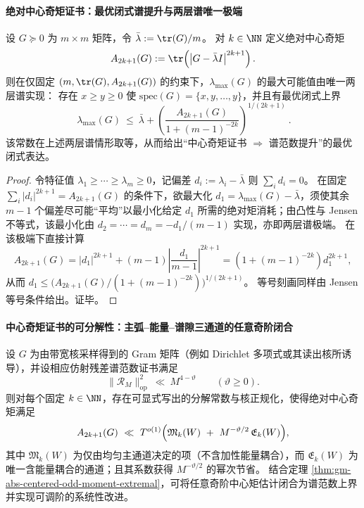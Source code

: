 \paragraph{绝对中心奇矩证书：最优闭式谱提升与两层谱唯一极端}
\begin{theorem}\label{thm:gm-abs-centered-odd-moment-extremal}
设 \(G\succeq 0\) 为 \(m\times m\) 矩阵，令 \(\bar\lambda:=\tr(G)/m\)。
对 \(k\in\NN\) 定义绝对中心奇矩
\[
A_{2k+1}(G):=\tr\!\left(\left|G-\bar\lambda I\right|^{2k+1}\right).
\]
则在仅固定 \((m,\tr(G),A_{2k+1}(G))\) 的约束下，\(\lambda_{\max}(G)\) 的最大可能值由唯一两层谱实现：
存在 \(x\ge y\ge 0\) 使 \(\mathrm{spec}(G)=\{x,y,\dots,y\}\)，并且有最优闭式上界
\[
\boxed{\ 
\lambda_{\max}(G)\ \le\ \bar\lambda+\left(\frac{A_{2k+1}(G)}{1+(m-1)^{-2k}}\right)^{\!1/(2k+1)}
\ }.
\]
该常数在上述两层谱情形取等，从而给出“中心奇矩证书 \(\Rightarrow\) 谱范数提升”的最优闭式表达。
\end{theorem}

\begin{proof}
令特征值 \(\lambda_1\ge\cdots\ge\lambda_m\ge 0\)，记偏差 \(d_i:=\lambda_i-\bar\lambda\) 则 \(\sum_i d_i=0\)。
在固定 \(\sum_i|d_i|^{2k+1}=A_{2k+1}(G)\) 的条件下，欲最大化 \(d_1=\lambda_{\max}(G)-\bar\lambda\)，须使其余 \(m-1\) 个偏差尽可能“平均”以最小化给定 \(d_1\) 所需的绝对矩消耗；由凸性与 Jensen 不等式，该最小化由
\(
d_2=\cdots=d_m=-d_1/(m-1)
\)
实现，亦即两层谱极端。
在该极端下直接计算
\[
A_{2k+1}(G)
=|d_1|^{2k+1}+(m-1)\left|\frac{d_1}{m-1}\right|^{2k+1}
=\left(1+(m-1)^{-2k}\right)d_1^{2k+1},
\]
从而 \(d_1\le \bigl(A_{2k+1}(G)/(1+(m-1)^{-2k})\bigr)^{1/(2k+1)}\)。
等号刻画同样由 Jensen 等号条件给出。证毕。
\end{proof}

\paragraph{中心奇矩证书的可分解性：主弧--能量--谱隙三通道的任意奇阶闭合}
\begin{proposition}\label{prop:gm-abs-centered-moment-three-channels}
设 \(G\) 为由带宽核采样得到的 Gram 矩阵（例如 Dirichlet 多项式或其读出核所诱导），并设相应仿射残差谱范数证书满足
\[
\|\mathcal{R}_M\|_{\mathrm{op}}^2\ \ll\ M^{4-\vartheta}\qquad(\vartheta\ge 0).
\]
则对每个固定 \(k\in\NN\)，存在可显式写出的分解常数与核正规化，使得绝对中心奇矩满足
\[
A_{2k+1}(G)\ \ll\ T^{o(1)}
\Bigl(
\mathfrak{M}_k(W)\ +\ M^{-\vartheta/2}\,\mathfrak{E}_k(W)
\Bigr),
\]
其中 \(\mathfrak{M}_k(W)\) 为仅由均匀主通道决定的项（不含加性能量耦合），而 \(\mathfrak{E}_k(W)\) 为唯一含能量耦合的通道；且其系数获得 \(M^{-\vartheta/2}\) 的幂次节省。
结合定理 \ref{thm:gm-abs-centered-odd-moment-extremal}，可将任意奇阶中心矩估计闭合为谱范数上界并实现可调阶的系统性改进。
\end{proposition}

